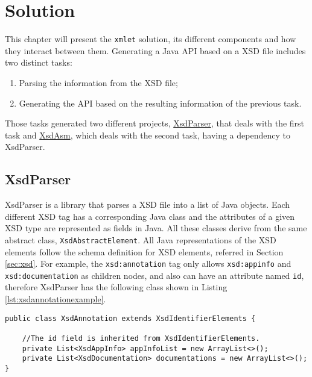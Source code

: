 \chapter{Solution}
\label{cha:solution}

\sloppy

This chapter will present the \texttt{xmlet} solution, its different components and how they interact between them. Generating a Java \ac{API} based on a \ac{XSD} file includes two distinct tasks:

\begin{enumerate}
\item Parsing the information from the \ac{XSD} file;
\item Generating the \ac{API} based on the resulting information of the previous task.
\end{enumerate}

\noindent
Those tasks generated two different projects, \hyperref[sec:xsdparser]{XsdParser}, that deals with the first task and \hyperref[sec:xsdasm]{XsdAsm}, which deals with the second task, having a dependency to XsdParser.

\section{XsdParser} %
\label{sec:xsdparser}

XsdParser is a library that parses a \ac{XSD} file into a list of Java objects. Each different \ac{XSD} tag has a corresponding Java class and the  attributes of a given \ac{XSD} type are represented as fields in Java. All these classes derive from the same abstract class, \texttt{XsdAbstractElement}. All Java representations of the \ac{XSD} elements follow the schema definition for \ac{XSD} elements, referred in Section \ref{sec:xsd}. For example, the \texttt{xsd:annotation} tag only allows \texttt{xsd:appinfo} and \texttt{xsd:documentation} as children nodes, and also can have an attribute named \texttt{id}, therefore XsdParser has the following class shown in Listing \ref{lst:xsdannotationexample}.

\bigskip


\begin{minipage}{\linewidth}
\begin{lstlisting}[caption={XsdAnnotation class (simplified)},captionpos=b,label={lst:xsdannotationexample}]
public class XsdAnnotation extends XsdIdentifierElements {

    //The id field is inherited from XsdIdentifierElements.
    private List<XsdAppInfo> appInfoList = new ArrayList<>();
    private List<XsdDocumentation> documentations = new ArrayList<>();
}
\end{lstlisting}
\end{minipage}

